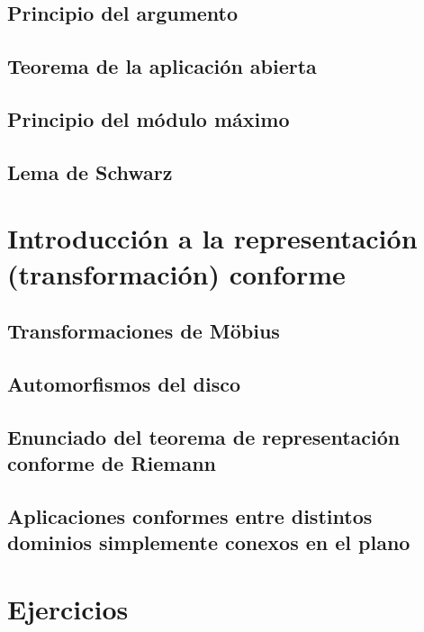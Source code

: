 \documentclass{apuntes}
\begin{document}
\section{Principio del argumento}
\section{Teorema de la aplicación abierta}
\section{Principio del módulo máximo}
\section{Lema de Schwarz}


\chapter{Introducción a la representación (transformación) conforme}
\section{Transformaciones de Möbius}
\section{Automorfismos del disco}
\section{Enunciado del teorema de representación conforme de Riemann}
\section{Aplicaciones conformes entre distintos dominios simplemente conexos en el plano}


\appendix

\chapter{Ejercicios}

\printindex
\end{document}
